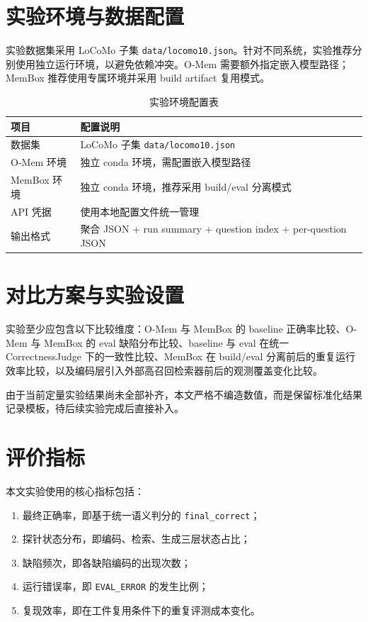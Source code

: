 \section{实验环境与数据配置}

实验数据集采用 LoCoMo 子集 \texttt{data/locomo10.json}。针对不同系统，实验推荐分别使用独立运行环境，以避免依赖冲突。O-Mem 需要额外指定嵌入模型路径；MemBox 推荐使用专属环境并采用 build artifact 复用模式。

\begin{table}[htbp]
\centering
\caption{实验环境配置表}
\label{tab:exp-env}
\begin{tabular}{p{}p{}}
\toprule
项目 & 配置说明 \\
\midrule
数据集 & LoCoMo 子集 \texttt{data/locomo10.json} \\
O-Mem 环境 & 独立 conda 环境，需配置嵌入模型路径 \\
MemBox 环境 & 独立 conda 环境，推荐采用 build/eval 分离模式 \\
API 凭据 & 使用本地配置文件统一管理 \\
输出格式 & 聚合 JSON + run summary + question index + per-question JSON \\
\bottomrule
\end{tabular}
\end{table}

\section{对比方案与实验设置}

实验至少应包含以下比较维度：O-Mem 与 MemBox 的 baseline 正确率比较、O-Mem 与 MemBox 的 eval 缺陷分布比较、baseline 与 eval 在统一 CorrectnessJudge 下的一致性比较、MemBox 在 build/eval 分离前后的重复运行效率比较，以及编码层引入外部高召回检索器前后的观测覆盖变化比较。

由于当前定量实验结果尚未全部补齐，本文严格不编造数值，而是保留标准化结果记录模板，待后续实验完成后直接补入。

\section{评价指标}

本文实验使用的核心指标包括：

\begin{enumerate}
    \item 最终正确率，即基于统一语义判分的 \texttt{final\_correct}；
    \item 探针状态分布，即编码、检索、生成三层状态占比；
    \item 缺陷频次，即各缺陷编码的出现次数；
    \item 运行错误率，即 \texttt{EVAL\_ERROR} 的发生比例；
    \item 复现效率，即在工件复用条件下的重复评测成本变化。
\end{enumerate}


